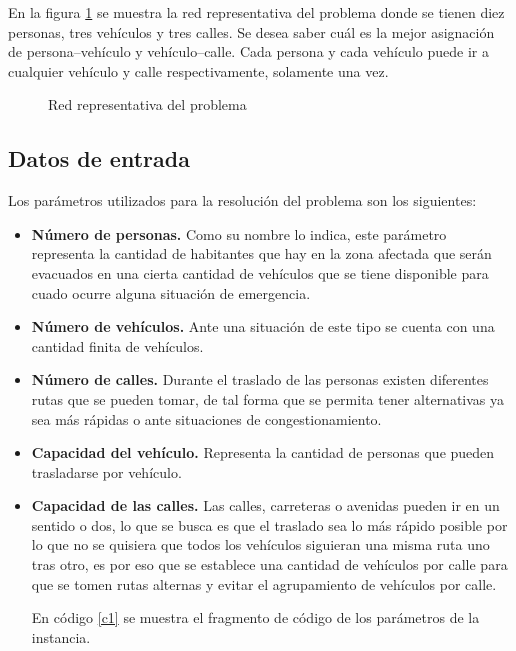 \documentclass{article}
\begin{document}
En la figura \ref{Grafos1} se muestra la red representativa del problema donde se tienen diez personas, tres vehículos y tres calles. Se desea saber cuál es la mejor asignación de persona--vehículo y vehículo--calle. Cada persona y cada vehículo puede ir a cualquier vehículo y calle respectivamente, solamente una vez.

\begin{figure}[H]
\centering
{}\hspace{-4.3mm}
\caption{Red representativa del problema} \label{Grafos1}
\end{figure}

\subsection*{Datos de entrada}
Los parámetros utilizados para la resolución del problema son los siguientes: 
\begin{itemize}
\item\textbf{Número de personas.} Como su nombre lo  indica, este parámetro representa la cantidad de habitantes que hay en la zona afectada que serán evacuados en una cierta cantidad de vehículos que se tiene disponible para cuado ocurre alguna situación de emergencia. 
\item\textbf{Número de vehículos.} Ante una situación de este tipo se cuenta con una cantidad finita de vehículos. 
\item\textbf{Número de calles.} Durante el traslado de las personas existen diferentes rutas que se pueden tomar, de tal forma que se permita tener alternativas ya sea más rápidas o ante situaciones de congestionamiento. 
\item\textbf{Capacidad del vehículo.} Representa la cantidad de personas que pueden trasladarse por vehículo. 
\item\textbf{Capacidad de las calles.} Las calles, carreteras o avenidas pueden ir en un sentido o dos, lo que se busca es que el traslado sea lo más rápido posible por lo que no se quisiera que todos los vehículos siguieran una misma ruta uno tras otro, es por eso que se establece una cantidad de vehículos por calle para que se tomen rutas alternas y evitar el agrupamiento de vehículos por calle.   

En código \ref{c1} se muestra el fragmento de código de los parámetros de la instancia.

\vspace{.3cm}
 \label{c1}
 
\vspace{.6cm}
\end{itemize}
\end{document}
